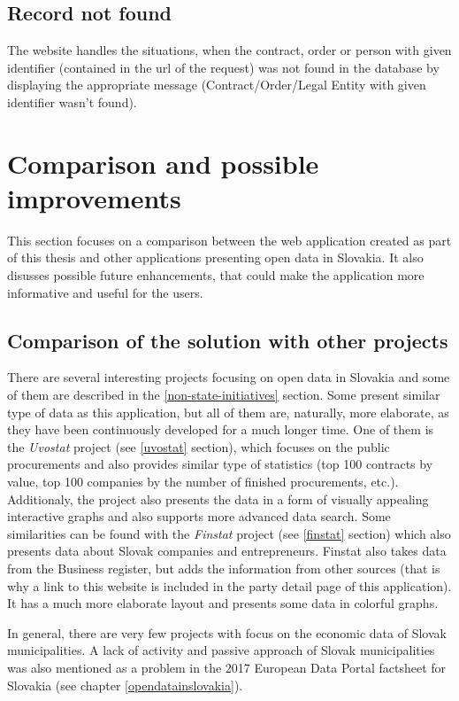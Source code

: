 \documentclass[thesis=B,english]{sprlajur-slovakopendata}[2018/05/12]
\begin{document}
{	\subsection{Record not found}
	The website handles the situations, when the contract, order or person with given identifier (contained in the url of the request) was not found in the database by displaying the appropriate message (Contract/Order/Legal Entity with given identifier wasn't found).
		
	\section{Comparison and possible improvements}
	This section focuses on a comparison between the web application created as part of this thesis and other applications presenting open data in Slovakia. It also disusses possible future enhancements, that could make the application more informative and useful for the users.
	\subsection{Comparison of the solution with other projects}
	There are several interesting projects focusing on open data in Slovakia and some of them are described in the \ref{non-state-initiatives} section. Some present similar type of data as this application, but all of them are, naturally, more elaborate, as they have been continuously developed for a much longer time. One of them is the \textit{Uvostat} project (see \ref{uvostat} section), which focuses on the public procurements and also provides similar type of statistics (top 100 contracts by value, top 100 companies by the number of finished procurements, etc.). Additionaly, the project also presents the data in a form of visually appealing interactive graphs and also supports more advanced data search. Some similarities can be found with the \textit{Finstat} project (see \ref{finstat} section) which also presents data about Slovak companies and entrepreneurs. Finstat also takes data from the Business register, but adds the information from other sources (that is why a link to this website is included in the party detail page of this application). It has a much more elaborate layout and presents some data in colorful graphs. 
		
	In general, there are very few projects with focus on the economic data of Slovak municipalities. A lack of activity and passive approach of Slovak municipalities was also mentioned as a problem in the 2017 European Data Portal factsheet for Slovakia (see chapter \ref{opendatainslovakia}).
}
\end{document}
